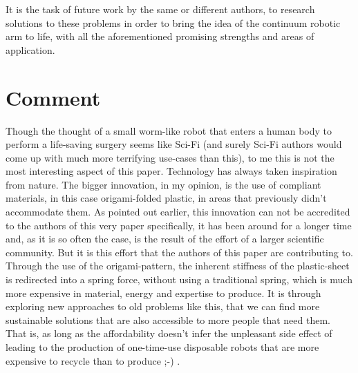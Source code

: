 It is the task of future work by the same or different authors, to research solutions to these problems in order to bring the idea of the continuum robotic arm to life, with all the aforementioned promising strengths and areas of application.


\section{Comment}\label{sec:comment}

Though the thought of a small worm-like robot that enters a human body to perform a life-saving surgery seems like Sci-Fi (and surely Sci-Fi authors would come up with much more terrifying use-cases than this), to me this is not the most interesting aspect of this paper.
Technology has always taken inspiration from nature.
The bigger innovation, in my opinion, is the use of compliant materials, in this case origami-folded plastic, in areas that previously didn't accommodate them.
As pointed out earlier, this innovation can not be accredited to the authors of this very paper specifically, it has been around for a longer time and, as it is so often the case, is the result of the effort of a larger scientific community.
But it is this effort that the authors of this paper are contributing to.
Through the use of the origami-pattern, the inherent stiffness of the plastic-sheet is redirected into a spring force, without using a traditional spring, which is much more expensive in material, energy and expertise to produce.
It is through exploring new approaches to old problems like this, that we can find more sustainable solutions that are also accessible to more people that need them.
That is, as long as the affordability doesn't infer the unpleasant side effect of leading to the production of one-time-use disposable robots that are more expensive to recycle than to produce ;-) .
